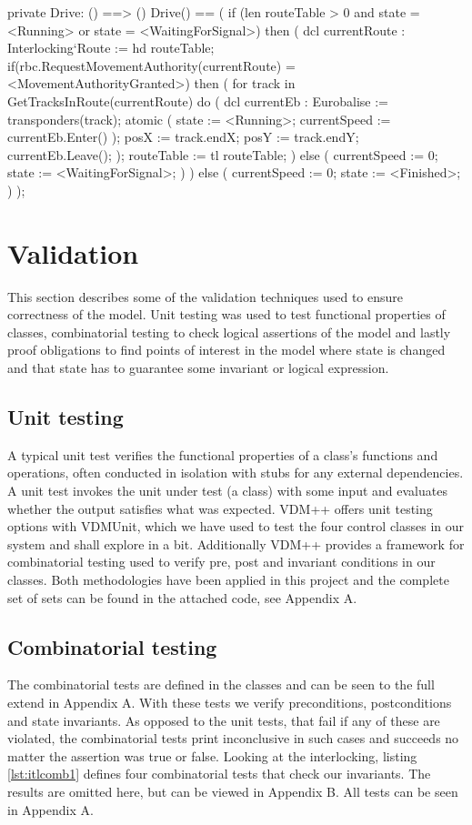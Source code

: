 \documentclass[preprint,12pt]{elsarticle}
\begin{document}
\begin{vdmsl}[label=lst:train1,caption={Drive() moves the train along a sequence of routes, requests MA for each route and obeys track speed limits.}]
	private Drive: () ==> ()
	Drive() ==
	(
	if (len routeTable > 0
		and state = <Running> or state = <WaitingForSignal>) then (
		dcl currentRoute : Interlocking`Route := hd routeTable;
		if(rbc.RequestMovementAuthority(currentRoute)
		 = <MovementAuthorityGranted>)
		then (
			for track in GetTracksInRoute(currentRoute) do (
				dcl currentEb : Eurobalise := transponders(track);
				atomic (
					state := <Running>;
					currentSpeed := currentEb.Enter()
				);
				posX := track.endX;
				posY := track.endY;
				currentEb.Leave();
				);
			routeTable := tl routeTable;
		) else (
			currentSpeed := 0;
			state := <WaitingForSignal>;
			)
		) else (
			currentSpeed := 0;
			state := <Finished>;
		)
	);
\end{vdmsl}

\section{Validation}

This section describes some of the validation techniques used to ensure correctness of the model. Unit testing was used to test functional properties of classes, combinatorial testing to check logical assertions of the model and lastly proof obligations to find points of interest in the model where state is changed and that state has to guarantee some invariant or logical expression.

\subsection{Unit testing}
A typical unit test verifies the functional properties of a class's functions and operations, often conducted in isolation with stubs for any external dependencies. A unit test invokes the unit under test (a class) with some input and evaluates whether the output satisfies what was expected. VDM++ offers unit testing options with VDMUnit, which we have used to test the four control classes in our system and shall explore in a bit. Additionally VDM++ provides a framework for combinatorial testing used to verify pre, post and invariant conditions in our classes. Both methodologies have been applied in this project and the complete set of sets can be found in the attached code, see Appendix A.

\subsection{Combinatorial testing}
The combinatorial tests are defined in the classes and can be seen to the full extend in Appendix A. With these tests we verify preconditions, postconditions and state invariants. As opposed to the unit tests, that fail if any of these are violated, the combinatorial tests print inconclusive in such cases and succeeds no matter the assertion was true or false. Looking at the interlocking, listing \ref{lst:itlcomb1} defines four combinatorial tests that check our invariants. The results are omitted here, but can be viewed in Appendix B. All tests can be seen in Appendix A.
\end{document}
